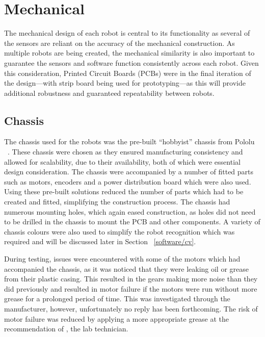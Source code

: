 
\chapter{Mechanical}\label{mechanical}

The mechanical design of each robot is central to its functionality as several of the sensors are
reliant on the accuracy of the mechanical construction. As multiple robots are being created, 
the mechanical similarity is also important to guarantee the sensors and software function consistently across each robot. 
Given this consideration, Printed Circuit Boards (PCBs) were in the
final iteration of the design---with strip board being used for prototyping---as this will provide additional robustness and guaranteed repeatability between robots.

\section{Chassis}\label{mech/chassis}
The chassis used for the robots was the pre-built ``hobbyist'' chassis from Pololu ~\cite{pololuchassis}. These chassis were chosen as they ensured manufacturing  consistency and allowed for scalability, due to their availability, both of which were essential design consideration. The chassis were accompanied by a number of fitted parts such as motors, encoders and a power distribution board which were also used. Using these pre-built solutions reduced the number of parts which had to be created and fitted, simplifying the construction process.
The chassis had numerous mounting holes, which again eased construction, as holes did not need to be drilled in the chassis to mount the PCB and other components. A variety of chassis colours were also used to simplify the robot recognition which was required and will be discussed later in Section ~\ref{software/cv}. 

During testing, issues were encountered with some of the motors which had accompanied the chassis, as it was noticed that they were leaking oil or grease from their plastic casing. This resulted in the gears making more noise than they did previously and resulted in motor failure if the motors were run without more grease for a prolonged period of time. This was investigated through the manufacturer, however, unfortunately no reply has been forthcoming. The risk of motor failure was reduced by applying a more appropriate grease at the recommendation of , the lab technician.  

